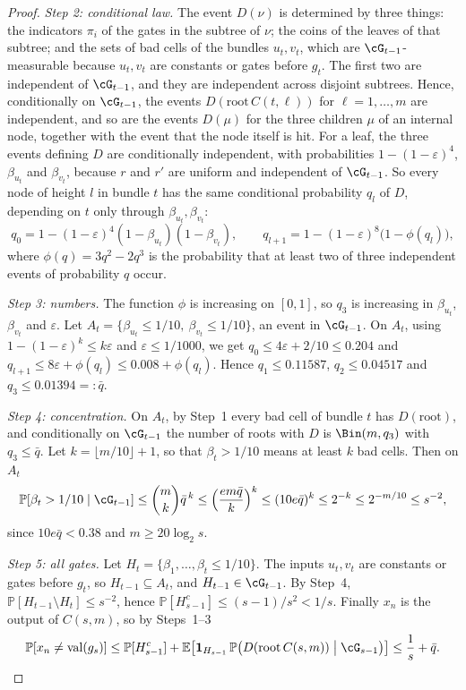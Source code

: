 \documentclass[11pt]{amsart}
\theoremstyle{definition}
\theoremstyle{remark}
\newcommand{\eps}{\varepsilon}
\newcommand{\val}{\mathrm{val}}
\newcommand{\PP}{\mathbb{P}}
\newcommand{\EE}{\mathbb{E}}
\begin{document}
\begin{proof}
\emph{Step 2: conditional law.} The event $D(\nu)$ is determined by three
things: the indicators $\pi_i$ of the gates in the subtree of $\nu$; the
coins of the leaves of that subtree; and the sets of bad cells of the
bundles $u_t,v_t$, which are $\cG_{t-1}$-measurable because $u_t,v_t$ are
constants or gates before $g_t$. The first two are independent of
$\cG_{t-1}$, and they are independent across disjoint subtrees. Hence,
conditionally on $\cG_{t-1}$, the events $D(\mathrm{root}\,C(t,\ell))$ for
$\ell=1,\dots,m$ are independent, and so are the events $D(\mu)$ for the
three children $\mu$ of an internal node, together with the event that the
node itself is hit. For a leaf, the three events defining $D$ are
conditionally independent, with probabilities $1-(1-\eps)^4$,
$\beta_{u_t}$ and $\beta_{v_t}$, because $r$ and $r'$ are uniform and
independent of $\cG_{t-1}$. So every node of height $l$ in bundle $t$ has
the same conditional probability $q_l$ of $D$, depending on $t$ only
through $\beta_{u_t},\beta_{v_t}$:
\begin{equation}\label{gb:eq-q1000}
q_0=1-(1-\eps)^4(1-\beta_{u_t})(1-\beta_{v_t}),\qquad
q_{l+1}=1-(1-\eps)^8\bigl(1-\phi(q_l)\bigr),
\end{equation}
where $\phi(q)=3q^2-2q^3$ is the probability that at least two of three
independent events of probability $q$ occur.

\emph{Step 3: numbers.} The function $\phi$ is increasing on $[0,1]$, so
$q_3$ is increasing in $\beta_{u_t}$, $\beta_{v_t}$ and $\eps$. Let
$A_t=\{\beta_{u_t}\le1/10,\ \beta_{v_t}\le1/10\}$, an event in
$\cG_{t-1}$. On $A_t$, using $1-(1-\eps)^k\le k\eps$ and
$\eps\le1/1000$, we get $q_0\le 4\eps+2/10\le0.204$ and
$q_{l+1}\le8\eps+\phi(q_l)\le 0.008+\phi(q_l)$. Hence $q_1\le0.11587$,
$q_2\le0.04517$ and $q_3\le0.01394=:\bar q$.

\emph{Step 4: concentration.} On $A_t$, by Step~1 every bad cell of bundle
$t$ has $D(\mathrm{root})$, and conditionally on $\cG_{t-1}$ the number of
roots with $D$ is $\Bin(m,q_3)$ with $q_3\le\bar q$. Let
$k=\lfloor m/10\rfloor+1$, so that $\beta_t>1/10$ means at least $k$ bad
cells. Then on $A_t$
\[
\PP[\beta_t>1/10\mid\cG_{t-1}]\le\binom mk\bar q^{\,k}
\le\Bigl(\frac{em\bar q}{k}\Bigr)^k\le(10e\bar q)^k\le2^{-k}
\le2^{-m/10}\le s^{-2},
\]
since $10e\bar q<0.38$ and $m\ge20\log_2 s$.

\emph{Step 5: all gates.} Let $H_t=\{\beta_1,\dots,\beta_t\le1/10\}$. The
inputs $u_t,v_t$ are constants or gates before $g_t$, so $H_{t-1}\subseteq
A_t$, and $H_{t-1}\in\cG_{t-1}$. By Step~4,
$\PP[H_{t-1}\setminus H_t]\le s^{-2}$, hence $\PP[H_{s-1}^c]\le
(s-1)/s^2<1/s$. Finally $x_n$ is the output of $C(s,m)$, so by Steps~1--3
\[
\PP[x_n\ne\val(g_s)]\le\PP[H_{s-1}^c]
+\EE\bigl[\mathbf 1_{H_{s-1}}\,\PP\bigl(D(\mathrm{root}\,C(s,m))\bigm|
\cG_{s-1}\bigr)\bigr]\le\frac1s+\bar q.\qedhere
\]
\end{proof}
\end{document}
